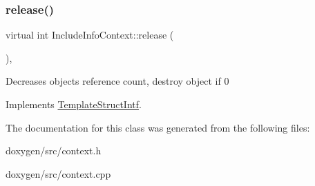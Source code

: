 \mbox{\label{class_include_info_context_a85637ec320e16700349765ab31878ded}} 
\subsubsection{\texorpdfstring{release()}{release()}}
{\footnotesize\ttfamily virtual int Include\+Info\+Context\+::release (\begin{DoxyParamCaption}{ }\end{DoxyParamCaption})\hspace{0.3cm}{\ttfamily [inline]}, {\ttfamily [virtual]}}

Decreases object\textquotesingle{}s reference count, destroy object if 0 

Implements \mbox{\hyperlink{class_template_struct_intf_a3dce7dd29d3f66a8080b40578e8a5045}{Template\+Struct\+Intf}}.



The documentation for this class was generated from the following files\+:\begin{DoxyCompactItemize}
\item 
doxygen/src/context.\+h\item 
doxygen/src/context.\+cpp\end{DoxyCompactItemize}
